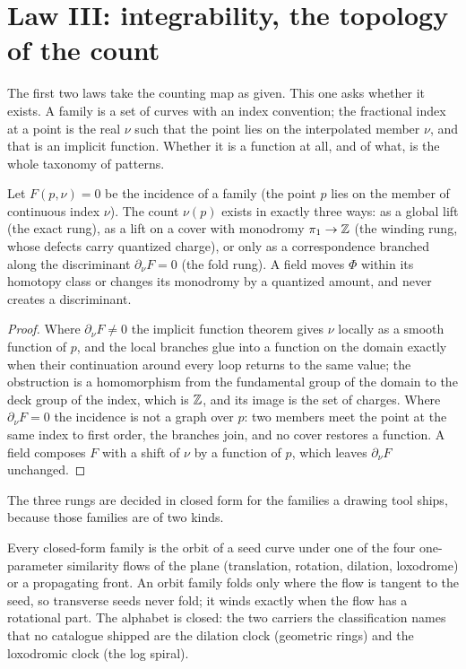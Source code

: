 \section{Law III: integrability, the topology of the count}
\label{sec:integrability}

The first two laws take the counting map as given. This one asks whether it
exists. A family is a set of curves with an index convention; the fractional
index at a point is the real $\nu$ such that the point lies on the
interpolated member $\nu$, and that is an implicit function. Whether it is a
function at all, and of what, is the whole taxonomy of patterns.

\begin{theorem}[Trichotomy]
\label{thm:trichotomy}
Let $F(p,\nu)=0$ be the incidence of a family (the point $p$ lies on the member
of continuous index $\nu$). The count $\nu(p)$ exists in exactly three ways:
as a global lift (the exact rung), as a lift on a cover with monodromy
$\pi_1\to\mathbb{Z}$ (the winding rung, whose defects carry quantized charge), or only
as a correspondence branched along the discriminant $\partial_\nu F=0$ (the
fold rung). A field moves $\Phi$ within its homotopy class or changes its
monodromy by a quantized amount, and never creates a discriminant.
\end{theorem}

\begin{proof}
Where $\partial_\nu F\ne0$ the implicit function theorem gives $\nu$ locally
as a smooth function of $p$, and the local branches glue into a function on
the domain exactly when their continuation around every loop returns to the
same value; the obstruction is a homomorphism from the fundamental group of
the domain to the deck group of the index, which is $\mathbb{Z}$, and its image is
the set of charges. Where $\partial_\nu F=0$ the incidence is not a graph
over $p$: two members meet the point at the same index to first order, the
branches join, and no cover restores a function. A field composes $F$ with a
shift of $\nu$ by a function of $p$, which leaves $\partial_\nu F$ unchanged.
\end{proof}

The three rungs are decided in closed form for the families a drawing tool
ships, because those families are of two kinds.

\begin{proposition}
\label{prop:carriers}
Every closed-form family is the orbit of a seed curve under one of the four
one-parameter similarity flows of the plane (translation, rotation, dilation,
loxodrome) or a propagating front. An orbit family folds only where the flow
is tangent to the seed, so transverse seeds never fold; it winds exactly when
the flow has a rotational part. The alphabet is closed: the two carriers the
classification names that no catalogue shipped are the dilation clock
(geometric rings) and the loxodromic clock (the log spiral).
\end{proposition}

